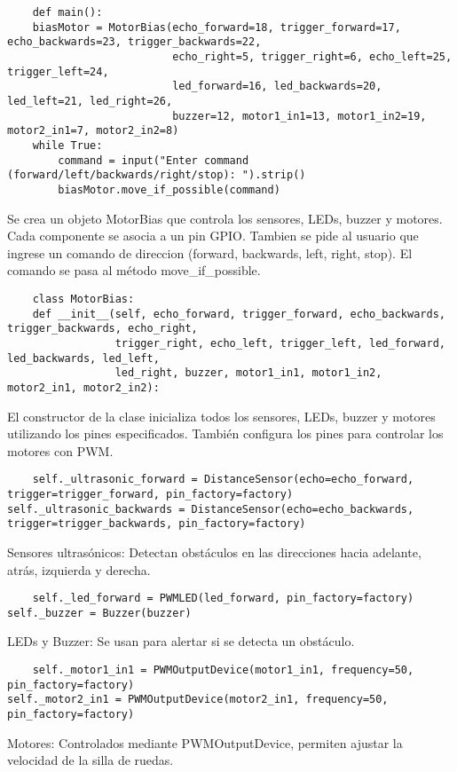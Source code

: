 \documentclass{article}
\begin{document}
\begin{lstlisting}
    def main():
    biasMotor = MotorBias(echo_forward=18, trigger_forward=17, echo_backwards=23, trigger_backwards=22, 
                          echo_right=5, trigger_right=6, echo_left=25, trigger_left=24, 
                          led_forward=16, led_backwards=20, led_left=21, led_right=26, 
                          buzzer=12, motor1_in1=13, motor1_in2=19, motor2_in1=7, motor2_in2=8)
    while True:
        command = input("Enter command (forward/left/backwards/right/stop): ").strip()
        biasMotor.move_if_possible(command)
\end{lstlisting}
Se crea un objeto MotorBias que controla los sensores, LEDs, buzzer y motores. Cada componente se asocia a un pin GPIO.
Tambien se pide al usuario que ingrese un comando de direccion (forward, backwards, left, right, stop). El comando se pasa al método move\_if\_possible.

\begin{lstlisting}
    class MotorBias:
    def __init__(self, echo_forward, trigger_forward, echo_backwards, trigger_backwards, echo_right, 
                 trigger_right, echo_left, trigger_left, led_forward, led_backwards, led_left, 
                 led_right, buzzer, motor1_in1, motor1_in2, motor2_in1, motor2_in2):
\end{lstlisting}
El constructor de la clase inicializa todos los sensores, LEDs, buzzer y motores utilizando los pines especificados. También configura los pines para controlar los motores con PWM.

\begin{lstlisting}
    self._ultrasonic_forward = DistanceSensor(echo=echo_forward, trigger=trigger_forward, pin_factory=factory)
self._ultrasonic_backwards = DistanceSensor(echo=echo_backwards, trigger=trigger_backwards, pin_factory=factory)
\end{lstlisting}
Sensores ultrasónicos: Detectan obstáculos en las direcciones hacia adelante, atrás, izquierda y derecha.

\begin{lstlisting}
    self._led_forward = PWMLED(led_forward, pin_factory=factory)
self._buzzer = Buzzer(buzzer)
\end{lstlisting}
LEDs y Buzzer: Se usan para alertar si se detecta un obstáculo.

\begin{lstlisting}
    self._motor1_in1 = PWMOutputDevice(motor1_in1, frequency=50, pin_factory=factory)
self._motor2_in1 = PWMOutputDevice(motor2_in1, frequency=50, pin_factory=factory)
\end{lstlisting}
Motores: Controlados mediante PWMOutputDevice, permiten ajustar la velocidad de la silla de ruedas.
\end{document}
